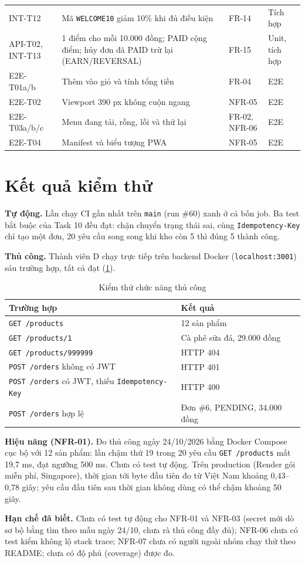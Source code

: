 {\begin{longtable}{@{}p{1.6cm}p{6.4cm}p{1.7cm}p{3.4cm}@{}}
INT-T12 & Mã \texttt{WELCOME10} giảm 10\% khi đủ điều kiện & FR-14 & Tích hợp \\
API-T02, INT-T13 & 1 điểm cho mỗi 10.000 đồng; PAID cộng điểm; hủy đơn đã PAID trừ lại (EARN/REVERSAL) & FR-15 & Unit, tích hợp \\
E2E-T01a/b & Thêm vào giỏ và tính tổng tiền & FR-04 & E2E \\
E2E-T02 & Viewport 390 px không cuộn ngang & NFR-05 & E2E \\
E2E-T03a/b/c & Menu đang tải, rỗng, lỗi và thử lại & FR-02, NFR-06 & E2E \\
E2E-T04 & Manifest và biểu tượng PWA & NFR-05 & E2E \\
\end{longtable}}

\section{Kết quả kiểm thử}\label{sec:se-ketquakt}
\textbf{Tự động.} Lần chạy CI gần nhất trên \texttt{main} (run \#60) xanh ở cả bốn job. Ba test bắt buộc của Task 10 đều đạt: chặn chuyển trạng thái sai, cùng \texttt{Idempotency-Key} chỉ tạo một đơn, 20 yêu cầu song song khi kho còn 5 thì đúng 5 thành công.

\textbf{Thủ công.} Thành viên D chạy trực tiếp trên backend Docker (\texttt{localhost:3001}) sáu trường hợp, tất cả đạt (\cref{tab:manual}).
\begin{table}[htbp]\centering
\caption{Kiểm thử chức năng thủ công}\label{tab:manual}
\begin{tabular}{@{}p{6.4cm}p{6.4cm}@{}}\toprule
\textbf{Trường hợp} & \textbf{Kết quả} \\ \midrule
\texttt{GET /products} & 12 sản phẩm \\
\texttt{GET /products/1} & Cà phê sữa đá, 29.000 đồng \\
\texttt{GET /products/999999} & HTTP 404 \\
\texttt{POST /orders} không có JWT & HTTP 401 \\
\texttt{POST /orders} có JWT, thiếu \texttt{Idempotency-Key} & HTTP 400 \\
\texttt{POST /orders} hợp lệ & Đơn \#6, PENDING, 34.000 đồng \\ \bottomrule
\end{tabular}
\end{table}

\textbf{Hiệu năng (NFR-01).} Đo thủ công ngày 24/10/2026 bằng Docker Compose cục bộ với 12 sản phẩm: lần chậm thứ 19 trong 20 yêu cầu \texttt{GET /products} mất 19,7 ms, đạt ngưỡng 500 ms. Chưa có test tự động. Trên production (Render gói miễn phí, Singapore), thời gian tới byte đầu tiên đo từ Việt Nam khoảng 0,43--0,78 giây; yêu cầu đầu tiên sau thời gian không dùng có thể chậm khoảng 50 giây.

\textbf{Hạn chế đã biết.} Chưa có test tự động cho NFR-01 và NFR-03 (secret mới dò sơ bộ bằng tìm theo mẫu ngày 24/10, chưa rà thủ công đầy đủ); NFR-06 chưa có test kiểm không lộ stack trace; NFR-07 chưa có người ngoài nhóm chạy thử theo README; chưa có độ phủ (coverage) được đo.
